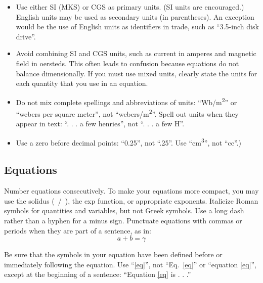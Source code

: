 \documentclass[conference]{IEEEtran}
\begin{document}
\begin{itemize}
\item Use either SI (MKS) or CGS as primary units. (SI units are
  encouraged.) English units may be used as secondary units (in
  parentheses). An exception would be the use of English units as
  identifiers in trade, such as ``3.5-inch disk drive''.
\item Avoid combining SI and CGS units, such as current in amperes and
  magnetic field in oersteds. This often leads to confusion because
  equations do not balance dimensionally. If you must use mixed units,
  clearly state the units for each quantity that you use in an
  equation.
\item Do not mix complete spellings and abbreviations of units:
  ``Wb/m\textsuperscript{2}'' or ``webers per square meter'', not
  ``webers/m\textsuperscript{2}''. Spell out units when they appear in
  text: ``. . . a few henries'', not ``. . . a few H''.
\item Use a zero before decimal points: ``0.25'', not ``.25''. Use
  ``cm\textsuperscript{3}'', not ``cc''.)
\end{itemize}

\subsection{Equations}
Number equations consecutively. To make your equations more compact,
you may use the solidus (~/~), the exp function, or appropriate
exponents. Italicize Roman symbols for quantities and variables, but
not Greek symbols. Use a long dash rather than a hyphen for a minus
sign. Punctuate equations with commas or periods when they are part of
a sentence, as in:
\begin{equation}
a+b=\gamma\label{eq}
\end{equation}

Be sure that the 
symbols in your equation have been defined before or immediately following 
the equation. Use ``\eqref{eq}'', not ``Eq.~\eqref{eq}'' or ``equation \eqref{eq}'', except at 
the beginning of a sentence: ``Equation \eqref{eq} is . . .''
\end{document}
